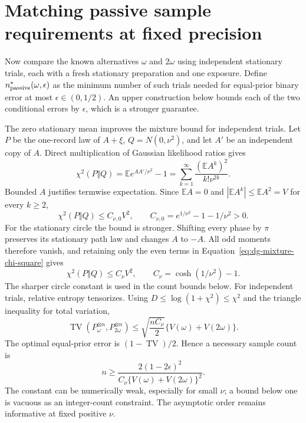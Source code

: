 \section{Matching passive sample requirements at fixed precision}

Now compare the known alternatives $\omega$ and $2\omega$ using
independent stationary trials, each with a fresh stationary preparation and
one exposure. Define $n^*_{\rm passive}(\omega,\epsilon)$ as the minimum
number of such trials needed for equal-prior binary error at most
$\epsilon\in(0,1/2)$. An upper construction below bounds each of the two
conditional errors by $\epsilon$, which is a stronger guarantee.

The zero stationary mean improves the mixture bound for independent trials.
Let $P$ be the one-record law of $A+\xi$, $Q=N(0,\nu^2)$, and let
$A'$ be an independent copy of $A$. Direct multiplication of Gaussian
likelihood ratios gives
\begin{equation}
 \chi^2(P\Vert Q)
 =\mathbb E e^{AA'/\nu^2}-1
 =\sum_{k=1}^\infty
       \frac{(\mathbb E A^k)^2}{k!\nu^{2k}}.
 \label{eq:dg-mixture-chi-square}
\end{equation}
Bounded $A$ justifies termwise expectation. Since $\mathbb E A=0$ and
$|\mathbb E A^k|\leq\mathbb E A^2=V$ for every $k\geq2$,
\begin{equation}
\chi^2(P\Vert Q)\leq C_{\nu,0} V^2,
 \qquad C_{\nu,0}=e^{1/\nu^2}-1-1/\nu^2>0.
 \label{eq:dg-stationary-chi-square}
\end{equation}
For the stationary circle the bound is stronger. Shifting every phase by
$\pi$ preserves its stationary path law and changes $A$ to $-A$.
All odd moments therefore vanish, and retaining only the even terms in
Equation~\eqref{eq:dg-mixture-chi-square} gives
\begin{equation}
 \chi^2(P\Vert Q)\leq C_\nu V^2,
 \qquad C_\nu=\cosh(1/\nu^2)-1.
 \label{eq:dg-symmetric-chi-square}
\end{equation}
The sharper circle constant is used in the count bounds below.
For independent trials, relative entropy tensorizes. Using
$D\leq\log(1+\chi^2)\leq\chi^2$ and the triangle inequality for total
variation,
\[
 \operatorname{TV}(P_\omega^{\otimes n},P_{2\omega}^{\otimes n})
 \leq\sqrt{\frac{nC_\nu}{2}}\{V(\omega)+V(2\omega)\}.
\]
The optimal equal-prior error is $(1-\operatorname{TV})/2$. Hence a necessary
sample count is
\begin{equation}
 n\geq
 \frac{2(1-2\epsilon)^2}
      {C_\nu\{V(\omega)+V(2\omega)\}^2}.
 \label{eq:dg-passive-necessary}
\end{equation}
The constant can be numerically weak, especially for small $\nu$; a bound
below one is vacuous as an integer-count constraint. The asymptotic order
remains informative at fixed positive $\nu$.


